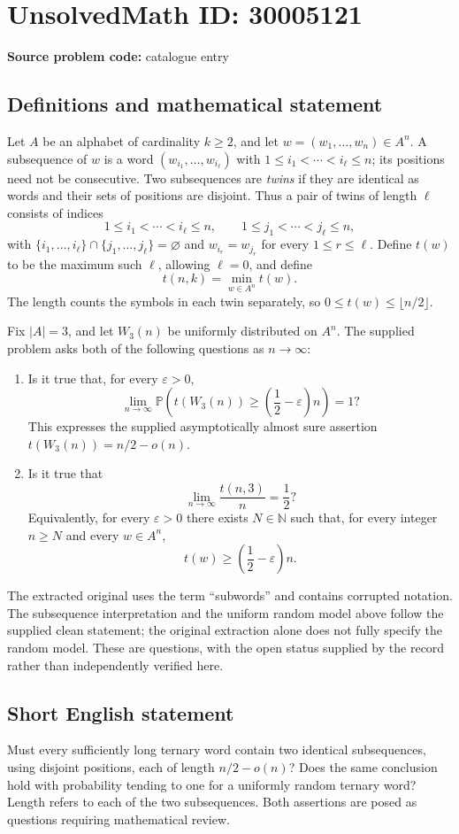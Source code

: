 \documentclass[11pt]{article}
\newcommand{\N}{\mathbb{N}}
\begin{document}
\section*{UnsolvedMath ID: 30005121}
\textbf{Source problem code:} catalogue entry
\subsection{Definitions and mathematical statement}
Let \(A\) be an alphabet of cardinality \(k\geq 2\), and let \(w=(w_1,\ldots,w_n)\in A^n\). A subsequence of \(w\) is a word \((w_{i_1},\ldots,w_{i_\ell})\) with \(1\leq i_1<\cdots<i_\ell\leq n\); its positions need not be consecutive. Two subsequences are \emph{twins} if they are identical as words and their sets of positions are disjoint. Thus a pair of twins of length \(\ell\) consists of indices
\[
1\leq i_1<\cdots<i_\ell\leq n,\qquad
1\leq j_1<\cdots<j_\ell\leq n,
\]
with \(\{i_1,\ldots,i_\ell\}\cap\{j_1,\ldots,j_\ell\}=\varnothing\) and \(w_{i_r}=w_{j_r}\) for every \(1\leq r\leq\ell\). Define \(t(w)\) to be the maximum such \(\ell\), allowing \(\ell=0\), and define
\[
t(n,k)=\min_{w\in A^n}t(w).
\]
The length counts the symbols in each twin separately, so \(0\leq t(w)\leq\lfloor n/2\rfloor\).

Fix \(|A|=3\), and let \(W_3(n)\) be uniformly distributed on \(A^n\). The supplied problem asks both of the following questions as \(n\to\infty\):
\begin{enumerate}
\item Is it true that, for every \(\varepsilon>0\),
\[
\lim_{n\to\infty}\mathbb{P}\!\left(t(W_3(n))\geq\left(\frac12-\varepsilon\right)n\right)=1?
\]
This expresses the supplied asymptotically almost sure assertion \(t(W_3(n))=n/2-o(n)\).
\item Is it true that
\[
\lim_{n\to\infty}\frac{t(n,3)}{n}=\frac12?
\]
Equivalently, for every \(\varepsilon>0\) there exists \(N\in\N\) such that, for every integer \(n\geq N\) and every \(w\in A^n\),
\[
t(w)\geq\left(\frac12-\varepsilon\right)n.
\]
\end{enumerate}
The extracted original uses the term ``subwords'' and contains corrupted notation. The subsequence interpretation and the uniform random model above follow the supplied clean statement; the original extraction alone does not fully specify the random model. These are questions, with the open status supplied by the record rather than independently verified here.
\subsection{Short English statement}
Must every sufficiently long ternary word contain two identical subsequences, using disjoint positions, each of length \(n/2-o(n)\)? Does the same conclusion hold with probability tending to one for a uniformly random ternary word? Length refers to each of the two subsequences. Both assertions are posed as questions requiring mathematical review.
\end{document}
